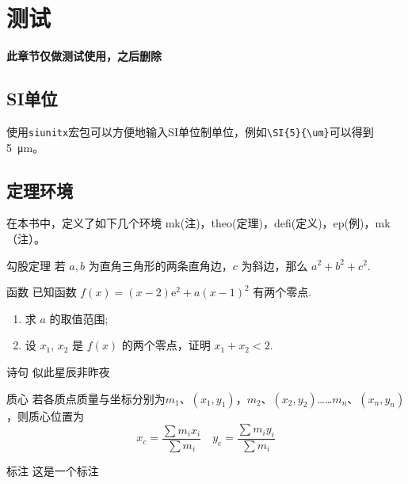 \documentclass{gbook}
\begin{document}
\setcounter{page}{0}

\newpage








\chapter{测试}

\textbf{此章节仅做测试使用，之后删除}

\section{SI单位}

使用\verb+siunitx+宏包可以方便地输入SI单位制单位，例如\verb+\SI{5}{\um}+可以得到\SI{5}{\um}。

\section{定理环境}

在本书中，定义了如下几个环境
mk(注)，theo(定理)，defi(定义)，ep(例)，mk（注）。

\begin{theo}{勾股定理}{}
若 $a,b$ 为直角三角形的两条直角边，$c$ 为斜边，那么 $a^2 + b^2 + c^2.$
\end{theo}

\begin{qu}{函数}{}
已知函数 $ f(x) = (x - 2)\mathrm{e}^{2} + a (x - 1)^{2} $ 有两个零点.
\begin{enumerate}[label=(\arabic*)]
  \item 求 $ a $ 的取值范围;
  \item 设 $ x_{1} $, $ x_{2} $ 是 $ f(x) $ 的两个零点，证明 $ x_{1} + x_{2} < 2 $.
\end{enumerate}
\end{qu}

\begin{ep}{诗句}{}
似此星辰非昨夜
\end{ep}

\begin{defi}{质心}{}
若各质点质量与坐标分别为$m_1$、$(x_1,y_1)$，$m_2$、$(x_2,y_2)$……$m_n$、$(x_n,y_n)$，则质心位置为
$$x_c = \frac{\sum m_i x_i}{\sum m_i} \quad y_c = \frac{\sum m_i y_i}{\sum m_i}$$
\end{defi}

\begin{mk}{标注}{}
这是一个标注
\end{mk}
\end{document}

